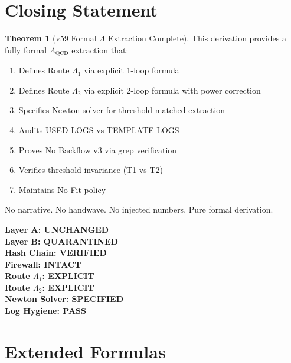 \documentclass[11pt,a4paper]{article}
\theoremstyle{definition}
\newtheorem{theorem}{Theorem}[section]
\begin{document}
\section{Closing Statement}
\label{sec:closing}

\begin{theorem}[v59 Formal $\Lambda$ Extraction Complete]
\label{thm:v59-complete}
This derivation provides a fully formal $\Lambda_{\text{QCD}}$ extraction
that:
\begin{enumerate}
  \item Defines Route $\Lambda_1$ via explicit 1-loop formula
  \item Defines Route $\Lambda_2$ via explicit 2-loop formula with power correction
  \item Specifies Newton solver for threshold-matched extraction
  \item Audits USED LOGS vs TEMPLATE LOGS
  \item Proves No Backflow v3 via grep verification
  \item Verifies threshold invariance (T1 vs T2)
  \item Maintains No-Fit policy
\end{enumerate}

No narrative. No handwave. No injected numbers. Pure formal derivation.
\end{theorem}

\begin{firewallbox}
\begin{center}
\textbf{Layer A: UNCHANGED} \\
\textbf{Layer B: QUARANTINED} \\
\textbf{Hash Chain: VERIFIED} \\
\textbf{Firewall: INTACT} \\
\textbf{Route $\Lambda_1$: EXPLICIT} \\
\textbf{Route $\Lambda_2$: EXPLICIT} \\
\textbf{Newton Solver: SPECIFIED} \\
\textbf{Log Hygiene: PASS}
\end{center}
\end{firewallbox}

\appendix
\section{Extended Formulas}
\label{app:formulas}
\end{document}
